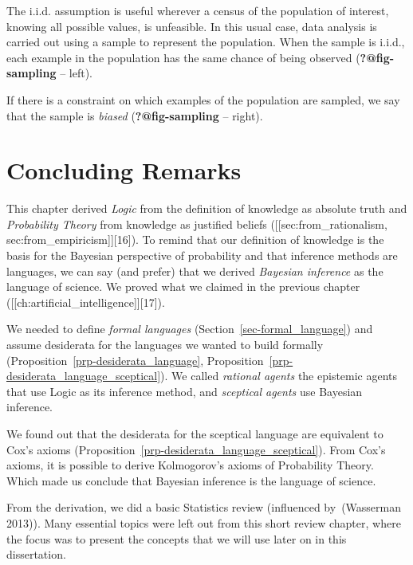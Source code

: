 \documentclass[
  letterpaper,
  12pt,
  british]{tufte-book}
\theoremstyle{plain}
\theoremstyle{definition}
\theoremstyle{plain}
\theoremstyle{remark}
\begin{document}
The i.i.d. assumption is useful wherever a census of the population of
interest, knowing all possible values, is unfeasible. In this usual
case, data analysis is carried out using a sample to represent the
population. When the sample is i.i.d., each example in the population
has the same chance of being observed (\textbf{?@fig-sampling} -- left).

If there is a constraint on which examples of the population are
sampled, we say that the sample is \emph{biased}
(\textbf{?@fig-sampling} -- right).

\hypertarget{concluding-remarks-1}{%
\section{Concluding Remarks}\label{concluding-remarks-1}}

This chapter derived \emph{Logic} from the definition of knowledge as
absolute truth and \emph{Probability Theory} from knowledge as justified
beliefs ({[}{[}sec:from\_rationalism,
sec:from\_empiricism{]}{]}{[}16{]}). To remind that our definition of
knowledge is the basis for the Bayesian perspective of probability and
that inference methods are languages, we can say (and prefer) that we
derived \emph{Bayesian inference} as the language of science. We proved
what we claimed in the previous chapter
({[}{[}ch:artificial\_intelligence{]}{]}{[}17{]}).

We needed to define \emph{formal languages}
(Section~\ref{sec-formal_language}) and assume desiderata for the
languages we wanted to build formally
(Proposition~\ref{prp-desiderata_language},
Proposition~\ref{prp-desiderata_language_sceptical}). We called
\emph{rational agents} the epistemic agents that use Logic as its
inference method, and \emph{sceptical agents} use Bayesian inference.

We found out that the desiderata for the sceptical language are
equivalent to Cox's axioms
(Proposition~\ref{prp-desiderata_language_sceptical}). From Cox's
axioms, it is possible to derive Kolmogorov's axioms of Probability
Theory. Which made us conclude that Bayesian inference is the language
of science.

From the derivation, we did a basic Statistics review (influenced
by~(Wasserman
2013)).
Many essential topics were left out from this short review chapter,
where the focus was to present the concepts that we will use later on in
this dissertation.
\end{document}

